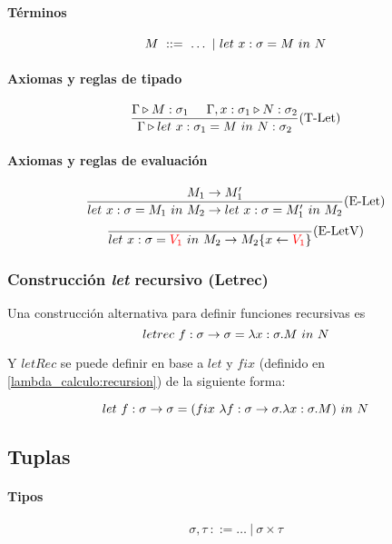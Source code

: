 \paragraph{Términos}
$$ M~::=~ \dots~|~let~x:\sigma = M~in~N $$


\paragraph{Axiomas y reglas de tipado}
\begin{equation*}
	\frac{\Gamma\triangleright M : \sigma_1\hspace*{5mm}\Gamma,x:\sigma_1\triangleright N : \sigma_2}{\Gamma\triangleright let~x:\sigma_1 = M~in~N : \sigma_2}(\text{T-Let})
\end{equation*}

\paragraph{Axiomas y reglas de evaluación}

\begin{equation*}
	\frac{M_1\to M_1'}{let~x:\sigma = M_1~in~M_2\to let~x:\sigma = M'_1~in~M_2}(\text{E-Let})
\end{equation*}
\vspace*{5mm}
\begin{equation*}
	\frac{}{let~x:\sigma = \color{red}V_1\color{black}~in~M_2\to M_2\{x\leftarrow\color{red}V_1\color{black}\}}(\text{E-LetV})
\end{equation*}

\subsubsection{Construcción \textit{let} recursivo (Letrec)}
Una construcción alternativa para definir funciones recursivas es 
$$letrec~f:\sigma\to\sigma = \lambda x: \sigma . M~in~N$$

Y $letRec$ se puede definir  en base a $let$ y $fix$ (definido en \ref{lambda_calculo:recursion}) de la siguiente forma:

$$let~f:\sigma\to\sigma = (fix~\lambda f: \sigma\to\sigma . \lambda x: \sigma . M)~in~N$$

\subsection{Tuplas}

\paragraph{Tipos}
$$\sigma,\tau~::= \dots~|~\sigma\times\tau$$

